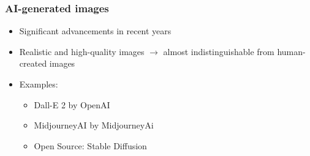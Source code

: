\documentclass[
	11pt, compress%
]{beamer}
\begin{document}
\begin{frame}
	\frametitle{AI-generated images}
	\begin{itemize}
		\setlength\itemsep{1,3em}
		\item Significant advancements in recent years
		\item Realistic and high-quality images $\rightarrow$ almost indistinguishable from human-created images
		\item Examples: 
		\begin{itemize}
			\item Dall-E 2 by OpenAI
			\item MidjourneyAI by MidjourneyAi
			\item Open Source: Stable Diffusion
		\end{itemize}
	\end{itemize}
\end{frame}
\end{document}
